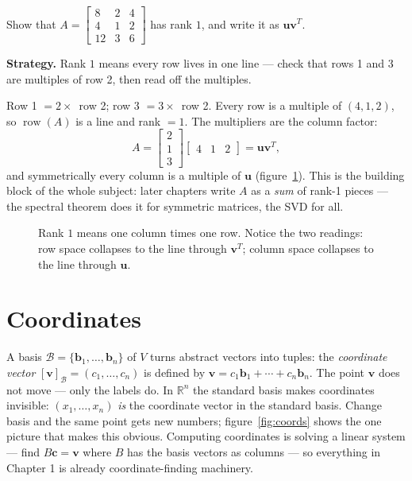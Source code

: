 \begin{example}\label{ex:rankone}
Show that
\(A=\begin{bmatrix}8&2&4\\4&1&2\\12&3&6\end{bmatrix}\)
has rank $1$, and write it as $\mathbf{u}\mathbf{v}^{T}$.
\par\smallskip
\textbf{Strategy.} Rank $1$ means every row lives in one line --- check
that rows 1 and 3 are multiples of row 2, then read off the multiples.
\begin{solution}
Row 1 $=2\times$~row 2; row 3 $=3\times$~row 2. Every row is a
multiple of $(4,1,2)$, so $\operatorname{row}(A)$ is a line and rank
$=1$. The multipliers are the column factor:
\[
  A=\begin{bmatrix}2\\1\\3\end{bmatrix}\begin{bmatrix}4&1&2\end{bmatrix}
    =\mathbf{u}\mathbf{v}^{T},
\]
and symmetrically every column is a multiple of $\mathbf{u}$
(figure~\ref{fig:rankone}). This is the building block of the whole
subject: later chapters write $A$ as a \emph{sum} of rank-1 pieces ---
the spectral theorem does it for symmetric matrices, the SVD for all.
\checkmark
\end{solution}
\end{example}

\begin{figure}[htbp]\centering

\caption{Rank $1$ means one column times one row. Notice the two
readings: row space collapses to the line through $\mathbf v^{T}$;
column space collapses to the line through $\mathbf u$.}
\label{fig:rankone}
\end{figure}

\section{Coordinates}\label{sec:coordinates}

A basis $\mathcal{B}=\{\mathbf{b}_1,\dots,\mathbf{b}_n\}$ of $V$ turns abstract vectors into tuples: the \emph{coordinate vector} $[\mathbf{v}]_{\mathcal{B}}=(c_1,\dots,c_n)$ is defined by $\mathbf{v}=c_1\mathbf{b}_1+\cdots+c_n\mathbf{b}_n$. The point $\mathbf{v}$ does not move — only the labels do. In $\mathbb{R}^n$ the standard basis makes coordinates invisible: $(x_1,\dots,x_n)$ \emph{is} the coordinate vector in the standard basis. Change basis and the same point gets new numbers; figure~\ref{fig:coords} shows the one picture that makes this obvious. Computing coordinates is solving a linear system — find $B\mathbf{c}=\mathbf{v}$ where $B$ has the basis vectors as columns — so everything in Chapter 1 is already coordinate-finding machinery.

